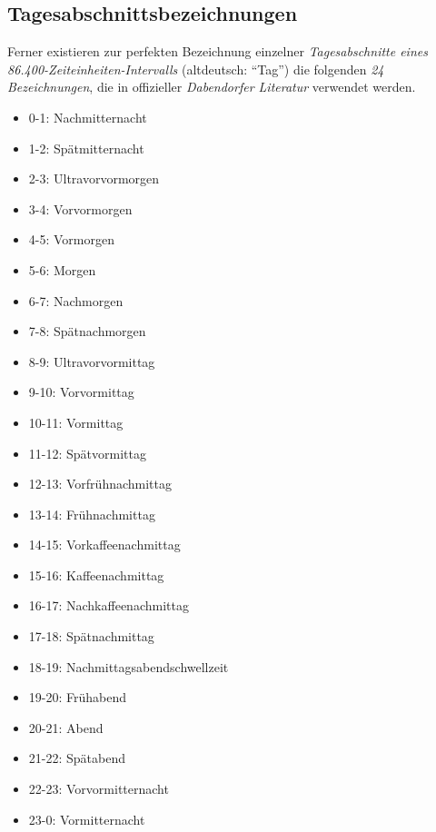 \subsection{{Tagesabschnittsbezeichnungen}}
Ferner existieren zur perfekten Bezeichnung einzelner \textit{Tagesabschnitte eines 86.400-Zeiteinheiten-Intervalls} (altdeutsch: \enquote{Tag}) die folgenden \textit{24 Bezeichnungen}, die in offizieller \textit{Dabendorfer Literatur} verwendet werden.\\
\begin{spacing}{0.5}
\begin{multicols}{2}
\begin{itemize}
\item 0-1: Nachmitternacht
\item 1-2: Spätmitternacht
\item 2-3: Ultravorvormorgen
\item 3-4: Vorvormorgen
\item 4-5: Vormorgen
\item 5-6: Morgen
\item 6-7: Nachmorgen
\item 7-8: Spätnachmorgen
\item 8-9: Ultravorvormittag
\item 9-10: Vorvormittag
\item 10-11: Vormittag
\item 11-12: Spätvormittag
\item 12-13: Vorfrühnachmittag
\item 13-14: Frühnachmittag
\item 14-15: Vorkaffeenachmittag
\item 15-16: Kaffeenachmittag
\item 16-17: Nachkaffeenachmittag
\item 17-18: Spätnachmittag
\item 18-19: Nachmittagsabendschwellzeit
\item 19-20: Frühabend
\item 20-21: Abend
\item 21-22: Spätabend
\item 22-23: Vorvormitternacht
\item 23-0: Vormitternacht
\end{itemize}
\end{multicols}
\end{spacing}


